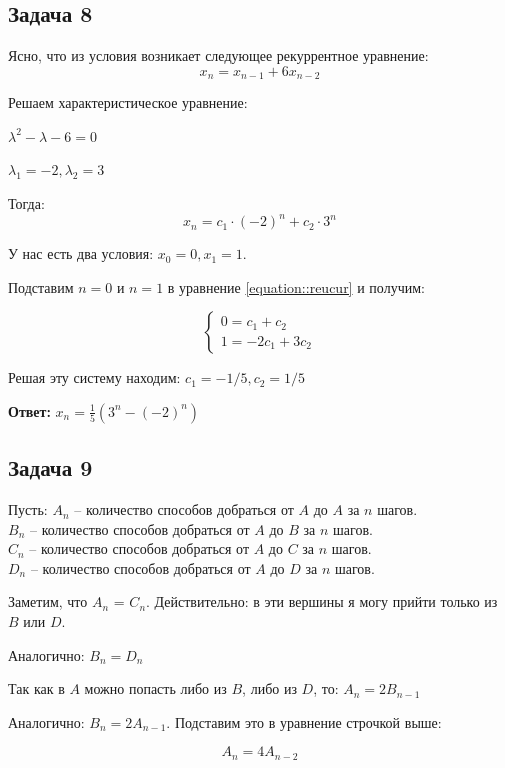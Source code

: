 \subsection{Задача 8}

Ясно, что из условия возникает следующее рекуррентное уравнение:
\[
x_n = x_{n-1} + 6x_{n-2}
\]

Решаем характеристическое уравнение:

$\lambda^2 - \lambda - 6 = 0$

$\lambda_1 = -2, \lambda_2 = 3$

Тогда: 
\begin{equation}
    x_n = c_1 \cdot (-2)^n + c_2 \cdot 3^n
    \label{equation::reucur}
\end{equation}

У нас есть два условия: $x_0 = 0, x_1 = 1$.

Подставим $n = 0$ и $n = 1$ в уравнение \ref{equation::reucur} и получим:

\begin{equation*}
\begin{cases}
    0 = c_1 + c_2 \\
    1 = -2c_1 + 3c_2
\end{cases}
\end{equation*}

Решая эту систему находим: $c_1 = -1/5, c_2 = 1/5$

\textbf{Ответ:} $x_n = \frac{1}{5}(3^n - (-2)^n )$
\subsection{Задача 9}

Пусть: $A_n$ -- количество способов добраться от $A$ до $A$ за $n$ шагов. \\
$B_n$ -- количество способов добраться от $A$ до $B$ за $n$ шагов. \\
$C_n$ -- количество способов добраться от $A$ до $C$ за $n$ шагов. \\
$D_n$ -- количество способов добраться от $A$ до $D$ за $n$ шагов.

Заметим, что $A_n$ = $C_n$. Действительно: в эти вершины я могу прийти только из $B$ или $D$. 

Аналогично: $B_n = D_n$

Так как в $A$ можно попасть либо из $B$, либо из $D$, то: $A_n = 2B_{n-1}$

Аналогично: $B_n = 2A_{n-1}$. Подставим это в уравнение строчкой выше:

\begin{equation}
   A_n = 4A_{n-2}
   \label{equation::recur2}
\end{equation}

